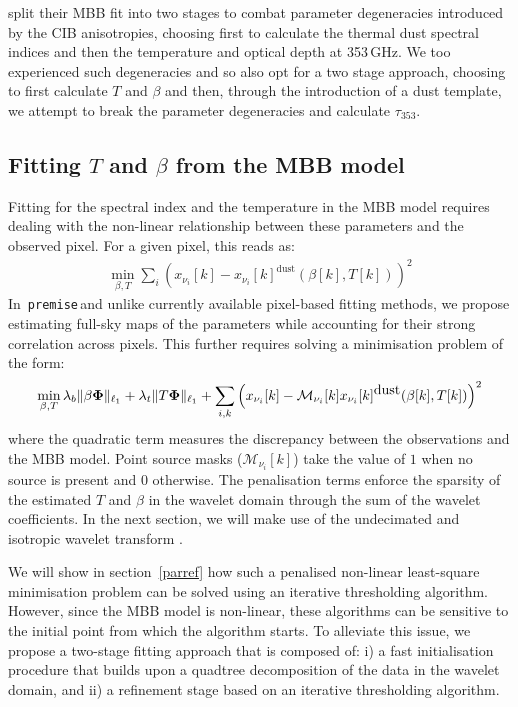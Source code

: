 \documentclass[a4paper,fleqn,usenatbib]{mnras}
\newcommand{\premise}{\texttt{premise}}
\begin{document}
\citet{pr2} split their MBB fit into two stages to combat parameter degeneracies introduced by the CIB anisotropies, choosing first to calculate the thermal dust spectral indices and then the temperature and optical depth at 353\,GHz. We too experienced such degeneracies and so also opt for a two stage approach, choosing to first calculate $T$ and $\beta$ and then, through the introduction of a dust template, we attempt to break the parameter degeneracies and calculate $\tau_{353}$.

\subsection{Fitting $T$ and $\beta$ from the MBB model}
Fitting for the spectral index and the temperature in the MBB model requires dealing with the non-linear relationship between these parameters and the observed pixel. For a given pixel, this reads as:
\begin{eqnarray}
\min_{\beta,T}  \sum_{i} \left({x}_{\nu_i}[k] - { x}_{\nu_i}[k]^{\mbox{dust}}(\beta[k],T[k]) \right)^2
\label{eq:pixfit}
\end{eqnarray}
In\, \premise \,and unlike currently available pixel-based fitting methods, we propose estimating full-sky maps of the parameters while accounting for their strong correlation across pixels. This further requires solving a minimisation problem of the form:
\begin{equation}\label{eq:nl_sparseLS}
\min_{\beta,T} \lambda_b \| \beta {\bf \Phi}\|_{\ell_1} + \lambda_t \| T {\bf \Phi}\|_{\ell_1} + \sum_{i,k} \left({x}_{\nu_i}[k] - \mathcal{M}_{\nu_i}[k] { x}_{\nu_i}[k]^{\mbox{dust}}(\beta[k],T[k]) \right)^2
\end{equation}
where the quadratic term measures the discrepancy between the observations and the MBB model. Point source masks ($\mathcal{M}_{\nu_i}[k]$) take the value of $1$ when no source is present and $0$ otherwise. The penalisation terms enforce the sparsity of the estimated $T$ and $\beta$ in the wavelet domain through the sum of the wavelet coefficients. In the next section, we will make use of the undecimated and isotropic wavelet transform \citep{starck2007undecimated}.

We will show in section~\ref{parref} how such a penalised non-linear least-square minimisation problem can be solved using an iterative thresholding algorithm. However, since the MBB model is non-linear, these algorithms can be sensitive to the initial point from which the algorithm starts. To alleviate this issue, we propose a two-stage fitting approach that is composed of: i) a fast initialisation procedure that builds upon a quadtree decomposition of the data in the wavelet domain, and ii) a refinement stage based on an iterative thresholding algorithm.
\end{document}
